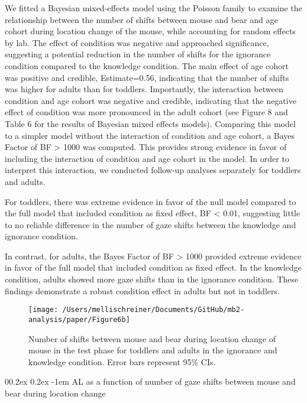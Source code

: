 \documentclass[
  man,floatsintext]{apa6}
\makeatletter
\let\oldparagraph\paragraph
\renewcommand{\paragraph}{
    \@ifstar
      \xxxParagraphStar
      \xxxParagraphNoStar
  }
\newcommand{\xxxParagraphStar}[1]{\oldparagraph*{#1}\mbox{}}
\newcommand{\xxxParagraphNoStar}[1]{\oldparagraph{#1}\mbox{}}
\renewcommand{\paragraph}{\@startsection{paragraph}{4}{\parindent}%
  {0\baselineskip \@plus 0.2ex \@minus 0.2ex}%
  {-1em}%
  {\normalfont\normalsize\bfseries\itshape\typesectitle}}
\makeatother
\begin{document}
We fitted a Bayesian mixed-effects model using the Poisson family to examine the relationship between the number of shifts between mouse and bear and age cohort during location change of the mouse, while accounting for random effects by lab. The effect of condition was negative and approached significance, suggesting a potential reduction in the number of shifts for the ignorance condition compared to the knowledge condition. The main effect of age cohort was positive and credible, Estimate=0.56, indicating that the number of shifts was higher for adults than for toddlers. Importantly, the interaction between condition and age cohort was negative and credible, indicating that the negative effect of condition was more pronounced in the adult cohort (see Figure 8 and Table 6 for the results of Bayesian mixed effects models).
Comparing this model to a simpler model without the interaction of condition and age cohort, a Bayes Factor of BF \textgreater{} 1000 was computed.
This provides strong evidence in favor of including the interaction of condition and age cohort in the model. In order to interpret this interaction, we conducted follow-up analyses separately for toddlers and adults.

For toddlers, there was extreme evidence in favor of the null model compared to the full model that included condition as fixed effect, BF \textless{} 0.01, suggesting little to no reliable difference in the number of gaze shifts between the knowledge and ignorance condition.

In contrast, for adults, the Bayes Factor of BF \textgreater{} 1000 provided extreme evidence in favor of the full model that included condition as fixed effect. In the knowledge condition, adults showed more gaze shifts than in the ignorance condition. These findings demonstrate a robust condition effect in adults but not in toddlers.

\begin{figure}

{\centering \texttt{[image: /Users/mellischreiner/Documents/GitHub/mb2-analysis/paper/Figure6b]} 

}

\caption{Number of shifts between mouse and bear during location change of mouse in the test phase for toddlers and adults in the ignorance and knowledge condition. Error bars represent 95\% CIs.}\label{fig:fig8}
\end{figure}

\paragraph{AL as a function of number of gaze shifts between mouse and bear during location change}\label{al-as-a-function-of-number-of-gaze-shifts-between-mouse-and-bear-during-location-change}
\end{document}
